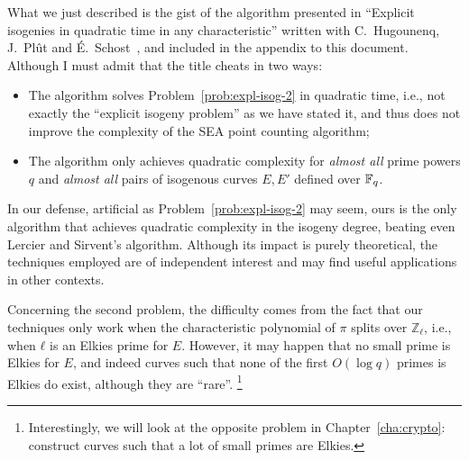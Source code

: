 \documentclass[b5layout]{hdr}
\begin{document}
What we just described is the gist of the algorithm presented in
``Explicit isogenies in quadratic time in any characteristic'' written
with C.~Hugounenq, J.~Plût and É.~Schost~\cite{defeo2016explicit}, and included
in the appendix to this document. %
Although I must admit that the title cheats in two ways:
\begin{itemize}
\item The algorithm solves Problem~\ref{prob:expl-isog-2} in quadratic
  time, i.e., not exactly the ``explicit isogeny problem'' as we have
  stated it, and thus does not improve the complexity of the SEA point
  counting algorithm;
\item The algorithm only achieves quadratic complexity for
  \emph{almost all} prime powers $q$ and \emph{almost all} pairs of
  isogenous curves $E,E'$ defined over $\mathbb{F}_q$. %
\end{itemize}

In our defense, artificial as Problem~\ref{prob:expl-isog-2} may seem,
ours is the only algorithm that achieves quadratic complexity in the
isogeny degree, beating even Lercier and Sirvent's algorithm. %
Although its impact is purely theoretical, the techniques employed are
of independent interest and may find useful applications in other
contexts. %

Concerning the second problem, the difficulty comes from the fact that
our techniques only work when the characteristic polynomial of $π$
splits over $ℤ_ℓ$, i.e., when $ℓ$ is an Elkies prime for $E$. %
However, it may happen that no small prime is Elkies for $E$, and
indeed curves such that none of the first $O(\log q)$ primes is Elkies
do exist, although they are ``rare''.%
\footnote{Interestingly, we will look at the opposite problem in
  Chapter~\ref{cha:crypto}: construct curves such that a lot of small
  primes are Elkies.} %
\end{document}
